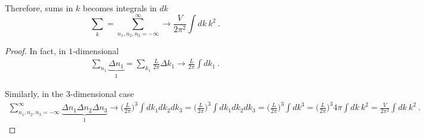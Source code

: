     Therefore, sums in $k$ becomes integrals in $dk$ 
    \begin{equation*}
        \sum_k = \sum_{n_1, n_2, n_2 = -\infty}^\infty \rightarrow \frac{V}{2\pi^2} \int dk~k^2 ~.
    \end{equation*}
    \begin{proof}
        In fact, in $1$-dimensional
        \begin{equation*}
        \begin{aligned}
            \sum_{n_1} \underbrace{\Delta n_1}_1 = \sum_{k_1} \frac{L}{2\pi} \Delta k_1 \rightarrow \frac{L}{2\pi} \int dk_1 ~.
        \end{aligned}
        \end{equation*}

        Similarly, in the $3$-dimensional case
        \begin{equation*}
        \begin{aligned}
            \sum_{n_1, n_2, n_3=- \infty}^\infty \underbrace{\Delta n_1 \Delta n_2 \Delta n_3}_1 \rightarrow \Big ( \frac{L}{2\pi} \Big)^3 \int dk_1 dk_2 dk_3 = \Big ( \frac{L}{2\pi} \Big)^3 \int dk_1 dk_2 dk_3 = \Big ( \frac{L}{2\pi} \Big)^3 \int dk^3 = \Big ( \frac{L}{2\pi} \Big)^3 4 \pi \int dk ~ k^2 = \frac{V}{2\pi^2} \int dk~k^2 ~. 
        \end{aligned}
        \end{equation*}
    \end{proof}

